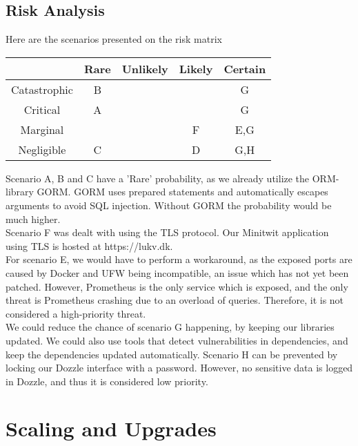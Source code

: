 \subsection{Risk Analysis}
Here are the scenarios presented on the risk matrix\\
\begin{center}
\begin{tabular}{ |c|c|c|c|c| } 
 \hline
  & Rare & Unlikely & Likely & Certain \\ 
 \hline
 Catastrophic & B &  &  & G\\ 
 \hline
 Critical & A &  &  & G \\ 
 \hline
 Marginal & &  &  F& E,G\\ 
 \hline
 Negligible & C &  & D & G,H\\ 
 \hline
\end{tabular}
\end{center}

Scenario A, B and C have a 'Rare' probability, as we already utilize the ORM-library GORM. GORM uses prepared statements and automatically escapes arguments to avoid SQL injection. Without GORM the probability would be much higher. \\
Scenario F was dealt with using the TLS protocol. Our Minitwit application using TLS is hosted at https://lukv.dk. \\

For scenario E, we would have to perform a workaround, as the exposed ports are caused by Docker and UFW being incompatible, an issue which has not yet been patched. However, Prometheus is the only service which is exposed, and the only threat is Prometheus crashing due to an overload of queries. Therefore, it is not considered a high-priority threat.\\
We could reduce the chance of scenario G happening, by keeping our libraries updated. We could also use tools that detect vulnerabilities in dependencies, and keep the dependencies updated automatically. 
Scenario H can be prevented by locking our Dozzle interface with a password. However, no sensitive data is logged in Dozzle, and thus it is considered low priority.

\section{Scaling and Upgrades}
